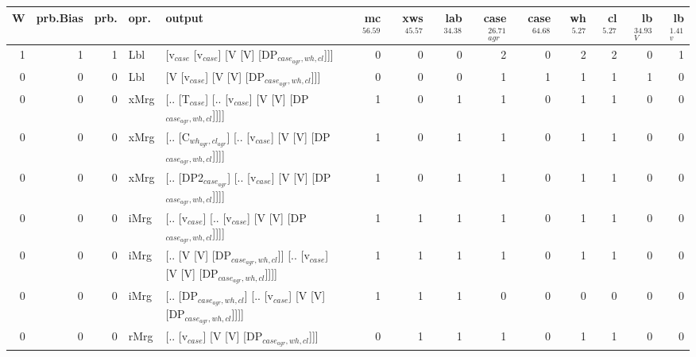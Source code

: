 \begin{tabularx}{\linewidth}{rrrlXrrrrrrrrr}
\hline
   W &   prb.Bias &   prb. & opr.   & output                                                                     &   mc$^{56.59}$ &   xws$^{45.57}$ &   lab$^{34.38}$ &   case$_{agr}^{26.71}$ &   case$^{64.68}$ &   wh$^{5.27}$ &   cl$^{5.27}$ &   lb$_{V}^{34.93}$ &   lb$_{v}^{1.41}$ \\
\hline
   1 &       1 &   1 & Lbl  & [v$_{case}$ [v$_{case}$] [V [V] [DP$_{case_{agr},wh,cl}$]]]                              &            0 &             0 &             0 &                  2 &              0 &           2 &           2 &              0 &             1 \\
   0 &       0 &   0 & Lbl  & [V [v$_{case}$] [V [V] [DP$_{case_{agr},wh,cl}$]]]                                   &            0 &             0 &             0 &                  1 &              1 &           1 &           1 &              1 &             0 \\
   0 &       0 &   0 & xMrg & [.. [T$_{case}$] [.. [v$_{case}$] [V [V] [DP$_{case_{agr},wh,cl}$]]]]                    &            1 &             0 &             1 &                  1 &              0 &           1 &           1 &              0 &             0 \\
   0 &       0 &   0 & xMrg & [.. [C$_{wh_{agr},cl_{agr}}$] [.. [v$_{case}$] [V [V] [DP$_{case_{agr},wh,cl}$]]]]           &            1 &             0 &             1 &                  1 &              0 &           1 &           1 &              0 &             0 \\
   0 &       0 &   0 & xMrg & [.. [DP2$_{case_{agr}}$] [.. [v$_{case}$] [V [V] [DP$_{case_{agr},wh,cl}$]]]]              &            1 &             0 &             1 &                  1 &              0 &           1 &           1 &              0 &             0 \\
   0 &       0 &   0 & iMrg & [.. [v$_{case}$] [.. [v$_{case}$] [V [V] [DP$_{case_{agr},wh,cl}$]]]]                    &            1 &             1 &             1 &                  1 &              0 &           1 &           1 &              0 &             0 \\
   0 &       0 &   0 & iMrg & [.. [V [V] [DP$_{case_{agr},wh,cl}$]] [.. [v$_{case}$] [V [V] [DP$_{case_{agr},wh,cl}$]]]] &            1 &             1 &             1 &                  1 &              0 &           1 &           1 &              0 &             0 \\
   0 &       0 &   0 & iMrg & [.. [DP$_{case_{agr},wh,cl}$] [.. [v$_{case}$] [V [V] [DP$_{case_{agr},wh,cl}$]]]]         &            1 &             1 &             1 &                  0 &              0 &           0 &           0 &              0 &             0 \\
   0 &       0 &   0 & rMrg & [.. [v$_{case}$] [V [V] [DP$_{case_{agr},wh,cl}$]]]                                  &            0 &             1 &             1 &                  1 &              0 &           1 &           1 &              0 &             0 \\
\hline
\end{tabularx}\endgroup\\
